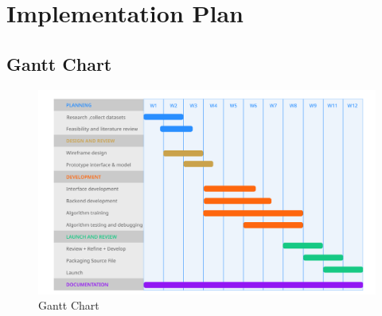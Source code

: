 \chapter {Implementation Plan}
\section{Gantt Chart}
\begin{figure}[H]
        \includegraphics[width=150mm, left]{./img/gantt_chart.png}
\caption{Gantt Chart}
\end{figure}
\clearpage
